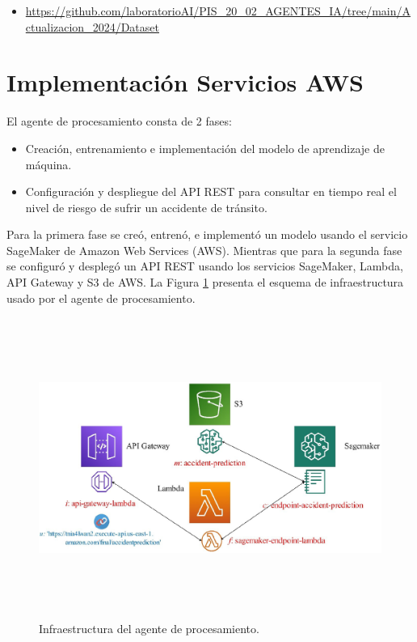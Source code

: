 \documentclass[a4paper,10pt, oneside, titlepage]{article}
\begin{document}
	\begin{itemize}
		\item \textcolor{blue}{\url{https://github.com/laboratorioAI/PIS_20_02_AGENTES_IA/tree/main/Actualizacion_2024/Dataset}}
	\end{itemize}
	
	\section{Implementación Servicios AWS}
	El agente de procesamiento consta de 2 fases:
	\begin{itemize}
		\item Creación, entrenamiento e implementación del modelo de aprendizaje de máquina.
		\item Configuración y despliegue del API REST para consultar en tiempo real el nivel de riesgo de sufrir un accidente de tránsito.
	\end{itemize}
	\indent\indent Para la primera fase se creó, entrenó, e implementó un modelo usando el servicio SageMaker de Amazon Web Services (AWS). Mientras que para la segunda fase se configuró y desplegó un API REST usando los servicios SageMaker, Lambda, API Gateway y S3 de AWS. La Figura \ref{Infraestructura} presenta el esquema de infraestructura usado por el agente de procesamiento.
	\begin{figure}[!h]
		\centering
		\includegraphics[width = 1\linewidth, height = 9.8cm]{Infraestructura.png}
		\caption{Infraestructura del agente de procesamiento.}
		\label{Infraestructura}
	\end{figure}
\end{document}
